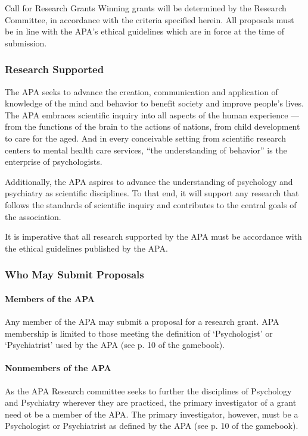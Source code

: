 \begin{refsection}
\begin{apatextbox}{Call for Research Grants}
Winning grants will be determined by the Research Committee, in accordance with the criteria specified herein. All proposals must be in line with the APA's ethical guidelines which are in force at the time of submission.

\subsubsection{Research Supported}
\label{researchsupported}

The APA seeks to advance the creation, communication and application of knowledge of the mind and behavior to benefit society and improve people's lives. The APA embraces scientific inquiry into all aspects of the human experience --- from the functions of the brain to the actions of nations, from child development to care for the aged. And in every conceivable setting from scientific research centers to mental health care services, ``the understanding of behavior'' is the enterprise of psychologists.

Additionally, the APA aspires to advance the understanding of psychology and psychiatry as scientific disciplines. To that end, it will support any research that follows the standards of scientific inquiry and contributes to the central goals of the association.

It is imperative that all research supported by the APA must be accordance with the ethical guidelines published by the APA. 

\subsubsection{Who May Submit Proposals}
\label{whomaysubmitproposals}

\paragraph{Members of the APA}
\label{membersoftheapa}

Any member of the APA may submit a proposal for a research grant. APA membership is limited to those meeting the definition of `Psychologist' or `Psychiatrist' used by the APA (see p. 10 of the gamebook).

\paragraph{Nonmembers of the APA}
\label{nonmembersoftheapa}

As the APA Research committee seeks to further the disciplines of Psychology and Psychiatry wherever they are practiced, the primary investigator of a grant need ot be a member of the APA. The primary investigator, however, must be a Psychologist or Psychiatrist as defined by the APA (see p. 10 of the gamebook).


\end{apatextbox}
\end{refsection}

